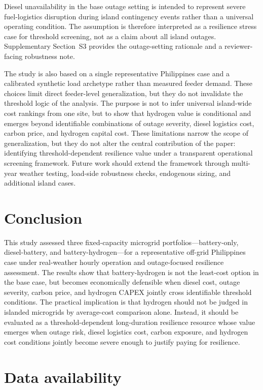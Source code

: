 \documentclass[preprint,12pt]{elsarticle}
\begin{document}
Diesel unavailability in the base outage setting is intended to represent severe fuel-logistics disruption during island contingency events rather than a universal operating condition. The assumption is therefore interpreted as a resilience stress case for threshold screening, not as a claim about all island outages. Supplementary Section~S3 provides the outage-setting rationale and a reviewer-facing robustness note.

The study is also based on a single representative Philippines case and a calibrated synthetic load archetype rather than measured feeder demand. These choices limit direct feeder-level generalization, but they do not invalidate the threshold logic of the analysis. The purpose is not to infer universal island-wide cost rankings from one site, but to show that hydrogen value is conditional and emerges beyond identifiable combinations of outage severity, diesel logistics cost, carbon price, and hydrogen capital cost. These limitations narrow the scope of generalization, but they do not alter the central contribution of the paper: identifying threshold-dependent resilience value under a transparent operational screening framework. Future work should extend the framework through multi-year weather testing, load-side robustness checks, endogenous sizing, and additional island cases.

\section{Conclusion}

This study assessed three fixed-capacity microgrid portfolios---battery-only, diesel-battery, and battery-hydrogen---for a representative off-grid Philippines case under real-weather hourly operation and outage-focused resilience assessment. The results show that battery-hydrogen is not the least-cost option in the base case, but becomes economically defensible when diesel cost, outage severity, carbon price, and hydrogen CAPEX jointly cross identifiable threshold conditions. The practical implication is that hydrogen should not be judged in islanded microgrids by average-cost comparison alone. Instead, it should be evaluated as a threshold-dependent long-duration resilience resource whose value emerges when outage risk, diesel logistics cost, carbon exposure, and hydrogen cost conditions jointly become severe enough to justify paying for resilience.

\section*{Data availability}
\end{document}
